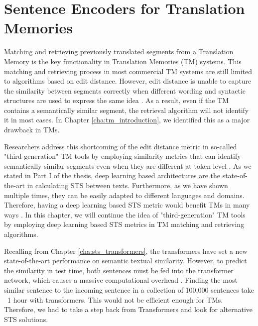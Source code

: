 \chapter{\label{cha:tm_sentence_encoders}Sentence Encoders for Translation Memories}
Matching and retrieving previously translated segments from a Translation Memory is the key functionality in Translation Memories (TM) systems. This matching and retrieving process in most commercial TM systems are still limited to algorithms based on edit distance. However, edit distance is unable to capture the similarity between segments correctly when different wording and syntactic structures are used to express the same idea \autocite{mitkov2008improving}. As a result, even if the TM contains a semantically similar segment, the retrieval algorithm will not identify it in most cases. In Chapter \ref{cha:tm_introduction}, we identified this as a major drawback in TMs.

Researchers address this shortcoming of the edit distance metric in so-called "third-generation" TM tools by employing similarity metrics that can identify semantically similar segments even when they are different at token level \autocite{pekar2007new}. As we stated in Part I of the thesis, deep learning based architectures are the state-of-the-art in calculating STS between texts. Furthermore, as we have shown multiple times, they can be easily adapted to different languages and domains. Therefore, having a deep learning based STS metric would benefit TMs in many ways \autocite{ranasinghe:2021}. In this chapter, we will continue the idea of "third-generation" TM tools by employing deep learning based STS metrics in TM matching and retrieving algorithms. 


Recalling from Chapter \ref{cha:sts_transformers}, the transformers have set a new state-of-the-art performance on semantic textual similarity. However, to predict the similarity in test time, both sentences must be fed into the transformer network, which causes a massive computational overhead \autocite{reimers-gurevych-2019-sentence}. Finding the most similar sentence to the incoming sentence in a collection of 100,000 sentences take ~1 hour with transformers. This would not be efficient enough for TMs. Therefore, we had to take a step back from Transformers and look for alternative STS solutions. 

